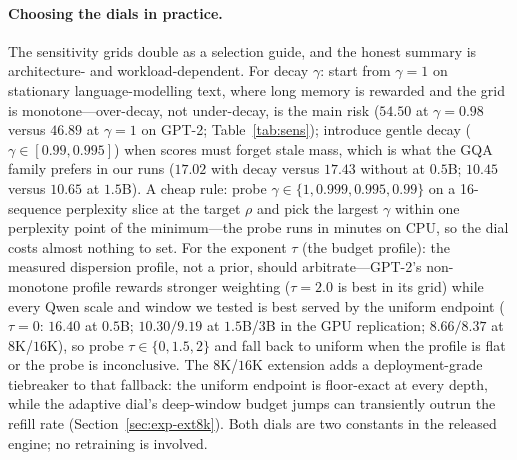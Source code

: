 \paragraph{Choosing the dials in practice.}
The sensitivity grids double as a selection guide, and the honest summary
is architecture- and workload-dependent. For decay $\gamma$: start from
$\gamma=1$ on stationary language-modelling text, where long memory is
rewarded and the grid is monotone---over-decay, not under-decay, is the
main risk ($54.50$ at $\gamma=0.98$ versus $46.89$ at $\gamma=1$ on
GPT-2; Table~\ref{tab:sens}); introduce gentle decay
($\gamma\in[0.99,0.995]$) when scores must forget stale mass, which is
what the GQA family prefers in our runs ($17.02$ with decay versus
$17.43$ without at $0.5$B; $10.45$ versus $10.65$ at $1.5$B). A cheap
rule: probe $\gamma\in\{1,0.999,0.995,0.99\}$ on a 16-sequence
perplexity slice at the target $\rho$ and pick the largest $\gamma$
within one perplexity point of the minimum---the probe runs in minutes
on CPU, so the dial costs almost nothing to set. For the exponent $\tau$
(the budget profile): the measured dispersion profile, not a prior,
should arbitrate---GPT-2's non-monotone profile rewards stronger
weighting ($\tau=2.0$ is best in its grid) while every Qwen scale and
window we tested is best served by the uniform endpoint ($\tau=0$:
$16.40$ at $0.5$B; $10.30/9.19$ at $1.5$B/3B in the GPU replication;
$8.66/8.37$ at $8$K/$16$K), so probe
$\tau\in\{0,1.5,2\}$ and fall back to uniform when the profile is flat
or the probe is inconclusive. The $8$K/$16$K extension adds a
deployment-grade tiebreaker to that fallback: the uniform endpoint is
floor-exact at every depth, while the adaptive dial's deep-window
budget jumps can transiently outrun the refill rate
(Section~\ref{sec:exp-ext8k}). Both dials are two constants in the
released engine; no retraining is involved.

